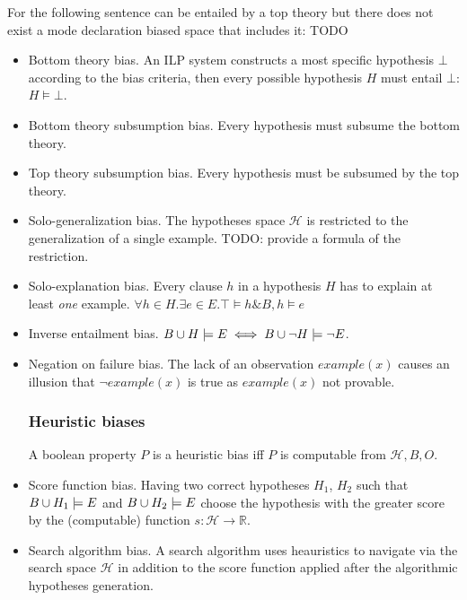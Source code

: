 \begin{exmp}
For the following sentence can be entailed by a top theory but there does not exist a mode declaration biased space that includes it:
TODO
\end{exmp}

\begin{itemize}
\item Bottom theory bias. An ILP system constructs a most specific hypothesis $\bot$ according to the bias criteria, then every possible hypothesis $H$ must entail $\bot$: $H \models \bot$.
\item Bottom theory subsumption bias. Every hypothesis must subsume the bottom theory.
\item Top theory subsumption bias. Every hypothesis must be subsumed by the top theory.
\item Solo-generalization bias. The hypotheses space $\mathcal{H}$ is restricted to the generalization of a single example. \cite{muggleton2012}
TODO: provide a formula of the restriction.
\item Solo-explanation bias. Every clause $h$ in a hypothesis $H$ has to explain at least \emph{one} example.
$\forall h \in H. \exists e \in E. \top \models h \& B, h \models e$
\item Inverse entailment bias.
$B \cup H \models E \iff B \cup \neg H \models \neg E$.
\item Negation on failure bias. The lack of an observation $example(x)$
causes an illusion that $\neg example(x)$ is true as $example(x)$ not provable.

\subsubsection{Heuristic biases}
\begin{defn}
A boolean property $P$ is a heuristic bias iff $P$ is computable from $\mathcal{H}, B, O$.
\end{defn}
\item Score function bias. Having two correct hypotheses $H_1$, $H_2$ such that $B \cup H_1 \models E$ and $B \cup H_2 \models E$ choose the hypothesis with the greater score by the (computable) function $s:\mathcal{H} \to \mathbb{R}$.
\item Search algorithm bias. A search algorithm uses heauristics to navigate via the search space $\mathcal{H}$ in addition to the score function applied after the algorithmic hypotheses generation.
\end{itemize}

